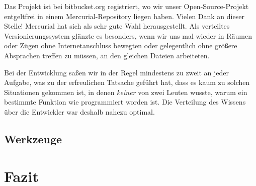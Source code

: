 \documentclass[ngerman]{article}
\begin{document}
Das Projekt ist bei bitbucket.org registriert, wo wir unser Open-Source-Projekt
entgeltfrei in einem Mercurial-Repository liegen haben. Vielen Dank an dieser Stelle!
Mercurial hat sich als sehr gute Wahl herausgestellt. Als verteiltes Versionierungssystem
glänzte es besonders, wenn wir uns mal wieder in Räumen oder Zügen ohne Internetanschluss
bewegten oder gelegentlich ohne größere Absprachen treffen zu müssen, an den gleichen Dateien
arbeiteten.

Bei der Entwicklung saßen wir in der Regel mindestens zu zweit an jeder Aufgabe, 
was zu der erfreulichen Tatsache geführt hat, dass es kaum zu solchen Situationen
gekommen ist, in denen \textit{keiner} von zwei Leuten wusste, warum ein bestimmte Funktion wie
programmiert worden ist. Die Verteilung des Wissens über die Entwickler war deshalb 
nahezu optimal.

\subsection{Werkzeuge}

\section{Fazit}

%
\appendix

\newpage




 
\end{document}
